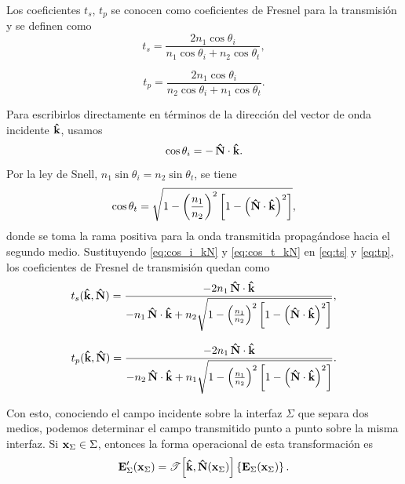 Los coeficientes $t_s$, $t_p$ se conocen como coeficientes de Fresnel para la transmisión \cite{bornwolf1999} y se definen como
\begin{equation}
  t_s =
  \frac{2 n_1 \cos\theta_i}
  {n_1\cos\theta_i+n_2\cos\theta_t},
  \label{eq:ts}
\end{equation}

\begin{equation}
  t_p =
  \frac{2 n_1 \cos\theta_i}
  {n_2\cos\theta_i+n_1\cos\theta_t}.
  \label{eq:tp}
\end{equation}

Para escribirlos directamente en términos de la dirección del vector de onda incidente $\bm{\hat{\mathbf{k}}}$, usamos
\begin{equation}
  \cos\theta_i = -\,\bm{\hat{\mathbf{N}}}\cdot\bm{\hat{\mathbf{k}}}.
  \label{eq:cos_i_kN}
\end{equation}
Por la ley de Snell, $n_1\sin\theta_i=n_2\sin\theta_t$, se tiene
\begin{equation}
  \cos\theta_t
  = \sqrt{1-\left(\frac{n_1}{n_2}\right)^2
  \left[1-\left(\bm{\hat{\mathbf{N}}}\cdot\bm{\hat{\mathbf{k}}}\right)^2\right]},
  \label{eq:cos_t_kN}
\end{equation}
donde se toma la rama positiva para la onda transmitida propagándose hacia el segundo medio. Sustituyendo \eqref{eq:cos_i_kN} y \eqref{eq:cos_t_kN} en \eqref{eq:ts} y \eqref{eq:tp}, los coeficientes de Fresnel de transmisión quedan como
\begin{equation}
t_s(\bm{\hat{\mathbf{k}}},\bm{\hat{\mathbf{N}}}) =
\frac{-2 n_1\,\bm{\hat{\mathbf{N}}}\cdot\bm{\hat{\mathbf{k}}}}
{-n_1\,\bm{\hat{\mathbf{N}}}\cdot\bm{\hat{\mathbf{k}}}
+ n_2\sqrt{1-\left(\frac{n_1}{n_2}\right)^2
\left[1-\left(\bm{\hat{\mathbf{N}}}\cdot\bm{\hat{\mathbf{k}}}\right)^2\right]}},
\label{eq:ts_kN}
\end{equation}

\begin{equation}
t_p(\bm{\hat{\mathbf{k}}},\bm{\hat{\mathbf{N}}}) =
\frac{-2 n_1\,\bm{\hat{\mathbf{N}}}\cdot\bm{\hat{\mathbf{k}}}}
{-n_2\,\bm{\hat{\mathbf{N}}}\cdot\bm{\hat{\mathbf{k}}}
+ n_1\sqrt{1-\left(\frac{n_1}{n_2}\right)^2
\left[1-\left(\bm{\hat{\mathbf{N}}}\cdot\bm{\hat{\mathbf{k}}}\right)^2\right]}}.
\label{eq:tp_kN}
\end{equation}

Con esto, conociendo el campo incidente sobre la interfaz $\Sigma$ que separa dos medios, podemos determinar el campo transmitido punto a punto sobre la misma interfaz. Si $\vb x_\Sigma\in\Sigma$, entonces la forma operacional de esta transformación es
\begin{equation}
  \vb{E}'_{\Sigma}(\vb x_\Sigma)
  =
  \mathscr{T}\!\left[
  \bm{\hat{\mathbf{k}}},\bm{\hat{\mathbf{N}}}(\vb x_\Sigma)
  \right]
  \left\{\vb{E}_{\Sigma}(\vb x_\Sigma)\right\}.
\end{equation}

